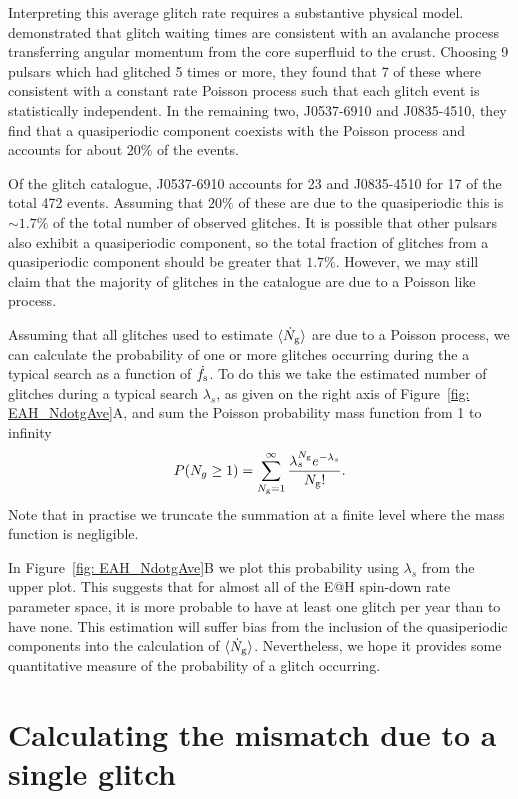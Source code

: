 \documentclass[../full_thesis/full_thesis.tex]{subfiles}
\begin{document}
Interpreting this average glitch rate requires a substantive physical
model. \citet{Melatos2008} demonstrated that glitch waiting times are consistent
with an avalanche process transferring angular momentum from the core superfluid
to the crust. Choosing 9 pulsars which had glitched 5 times or more, they found
that 7 of these where consistent with a constant rate Poisson process such that
each glitch event is statistically independent. In the remaining two, J0537-6910
and J0835-4510, they find that a quasiperiodic component coexists with the Poisson
process and accounts for about $20\%$ of the events.

Of the glitch catalogue, J0537-6910 accounts for 23 and J0835-4510 for 17 of
the total 472 events. Assuming that $20\%$ of these are due to the
quasiperiodic this is $\sim 1.7\%$ of the total number of observed glitches. It
is possible that other pulsars also exhibit a quasiperiodic component, so the
total fraction of glitches from a quasiperiodic component should be greater
that $1.7\%$. However, we may still claim that the majority of glitches in the
catalogue are due to a Poisson like process.

Assuming that all glitches used to estimate $\langle \dot{N}_{\textrm{g}}\rangle$ are due to a Poisson
process, we can calculate the probability of one or more glitches occurring during
the a typical search as a function of $\dot{f}_{\textrm{s}}$. To do this we take the
estimated number of glitches during a typical search
$\lambda_{s}$, as given on the right axis of Figure~\ref{fig: EAH_NdotgAve}A,
and sum the Poisson probability mass function from 1 to infinity
\begin{align}
P(N_{g} \ge 1) = \sum_{N_{\textrm{g}}=1}^{\infty}\frac{\lambda_{s}^{N_{\textrm{g}}}e^{-\lambda_{s}}}{N_{\textrm{g}}!}.
\end{align}
Note that in practise we truncate the summation at a finite level where the
mass function is negligible.

In Figure~\ref{fig: EAH_NdotgAve}B we plot this probability using $\lambda_{s}$
from the upper plot. This suggests that for almost all of the E@H spin-down
rate parameter space, it is more probable to have at least one glitch per year
than to have none. This estimation will suffer bias from the inclusion of the
quasiperiodic components into the calculation of $\langle \dot{N}_{\textrm{g}}\rangle$. Nevertheless, we
hope it provides some quantitative measure of the probability of a glitch
occurring.

\section{Calculating the mismatch due to a single glitch}
\label{sec: mismatch due to glitches}
\end{document}
